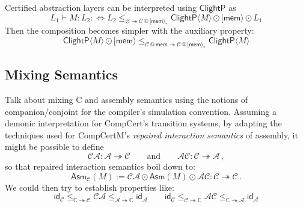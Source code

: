 \documentclass[acmsmall,screen,review,anonymous]{acmart}
\newcommand{\kw}[1]{\ensuremath{ \mathsf{#1} }}
\begin{document}
\begin{example}[CAL]
Certified abstraction layers can be interpreted
using \kw{ClightP} as
\[
  L_1 \vdash M : L_2 :\Leftrightarrow
  L_2 \le_{\varnothing \twoheadrightarrow \mathcal{C}\mathbin@ [\kw{mem}\rangle_* }
  \kw{ClightP}\langle M \rangle \odot [\kw{mem}\rangle \odot L_1
\]
Then the composition becomes simpler with
the auxiliary property:
\[
  \kw{ClightP}\langle M \rangle \odot [\kw{mem}\rangle \le_{ \mathcal{C} \mathbin@ \kw{mem} \twoheadrightarrow \mathcal{C}\mathbin@ [\kw{mem}\rangle_* }
  \kw{ClightP}\langle M \rangle
\]

\end{example}


\subsection{Mixing Semantics} %

Talk about mixing C and assembly semantics
using the notions of companion/conjoint
for the compiler's simulation convention.
Assuming a demonic interpretation for CompCert's transition systems,
by adapting
the techniques used for CompCertM's \emph{repaired interaction semantics} of assembly,
it might be possible to define
\[
  \mathcal{CA} : \mathcal{A} \twoheadrightarrow \mathcal{C}
  \qquad \text{and} \qquad
  \mathcal{AC} : \mathcal{C} \twoheadrightarrow \mathcal{A}
  \,,
\]
so that repaired interaction semantics boil down to:
\[
  \kw{Asm}_\mathcal{C}(M) := \mathcal{CA} \odot \kw{Asm}(M) \odot \mathcal{AC}
    : \mathcal{C} \twoheadrightarrow \mathcal{C}
  \,.
\]
We could then try to establish properties like:
\[
  \kw{id}_\mathcal{C}
  \le_{\mathbb{C} \twoheadrightarrow \mathcal{C}}
  \mathcal{CA}
  \le_{\mathcal{A} \twoheadrightarrow \mathbb{C}}
  \kw{id}_\mathcal{A}
  \qquad
  \kw{id}_\mathcal{C}
  \le_{\mathcal{C} \twoheadrightarrow \mathbb{C}}
  \mathcal{AC}
  \le_{\mathbb{C} \twoheadrightarrow \mathcal{A}}
  \kw{id}_\mathcal{A}
\]


\end{document}
